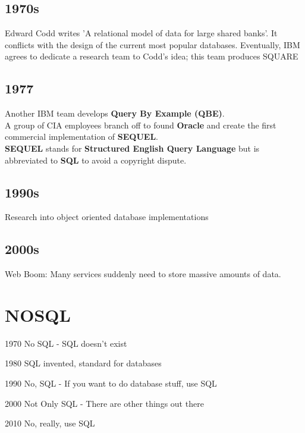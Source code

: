 \documentclass{article}
\begin{document}
\subsection*{1970s} Edward Codd writes 'A relational model of data for large
shared banks'.  It conflicts with the design of the current most popular
databases.  Eventually, IBM agrees to dedicate a research team to Codd's idea;
this team produces SQUARE

\subsection*{1977}
Another IBM team develops \textbf{Query By Example (QBE)}.\\
A group of CIA employees branch off to found \textbf{Oracle} and create the
first commercial implementation of \textbf{SEQUEL}.\\
\textbf{SEQUEL} stands for \textbf{Structured English Query Language} but is
abbreviated to \textbf{SQL} to avoid a copyright dispute.

\subsection*{1990s}
Research into object oriented database implementations

\subsection*{2000s}
Web Boom: Many services suddenly need to store massive amounts of data.

\section{NOSQL}
\begin{description}
    \item{1970} No SQL - SQL doesn't exist
    \item{1980} SQL invented, standard for databases
    \item{1990} No, SQL - If you want to do database stuff, use SQL
    \item{2000} Not Only SQL - There are other things out there
    \item{2010} No, really, use SQL
\end{description}
\end{document}
